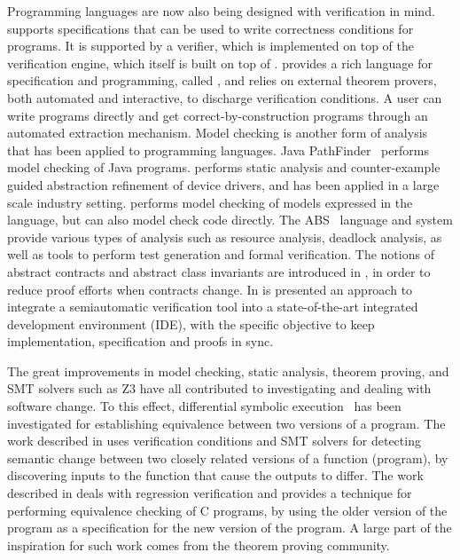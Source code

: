 Programming languages are now also being designed with verification in
mind.  \dafny{} \cite{leino-lpar-2010} supports specifications that
can be used to write correctness conditions for programs.
It is supported by a verifier, which is implemented on top of the
\boogie{} verification engine, which itself is built on top of
\zthree.  \whythree{} \cite{filliatre-why3-2011} provides a rich
language for specification and programming, called \whyml{}, and
relies on external theorem provers, both automated and interactive, to
discharge verification conditions. A user can write \whyml{} programs
directly and get correct-by-construction \ocaml{} programs through an
automated extraction mechanism. Model checking is another form of
analysis that has been applied to programming languages.  Java
PathFinder~\cite{havelund-jpf-00,havelund-visser02} performs model
checking of Java programs. \slam{} \cite{ball2010slam2} performs
static analysis and counter-example guided abstraction refinement of
device drivers, and has been applied in a large scale industry
setting.  \spin{} \cite{holzmann-spin-2004} performs model checking of
models expressed in the \promela{} language, but can also model check
\clang{} code directly. The ABS~\cite{hahnle2012abstract} language and
system provide various types of analysis such as resource analysis,
deadlock analysis, as well as tools to perform test generation and
formal verification.
The notions of abstract contracts and abstract class invariants
are introduced in \cite{abstract-contracts-14}, in order 
to reduce proof efforts when contracts change. 
In \cite{interactive-IDE-14} is presented 
an approach to integrate a semiautomatic
verification tool into a state-of-the-art integrated development
environment (IDE), with the specific objective to keep implementation,
specification and proofs in sync. 

The great improvements in model checking, static analysis, theorem
proving, and SMT solvers such as Z3 have all
contributed to investigating and dealing with software change. To this
effect, differential symbolic execution~\cite{person2008differential}
has been investigated for establishing equivalence between two
versions of a program. The work described in \cite{lahiri2012symdiff}
uses verification conditions and SMT solvers for detecting semantic
change between two closely related versions of a function (program),
by discovering inputs to the function that cause the outputs to
differ. The work described in \cite{godlin2009regression} deals with
regression verification and provides a technique for performing
equivalence checking of C programs, by using the older version of the
program as a specification for the new version of the program. A large
part of the inspiration for such work comes from the theorem proving
community.

